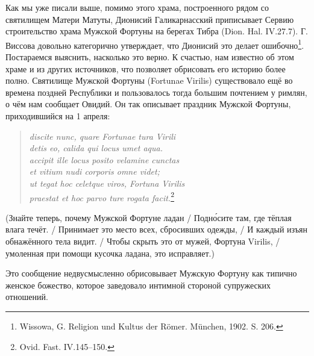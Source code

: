 Как мы уже писали выше, помимо этого храма, построенного рядом со святилищем Матери Матуты, Дионисий Галикарнасский приписывает Сервию строительство храма Мужской Фортуны на берегах Тибра (Dion. Hal. IV.27.7). Г. Виссова довольно категорично утверждает, что Дионисий это делает ошибочно\footnote{Wissowa, G. Religion und Kultus der R\"{o}mer. M\"{u}nchen, 1902. S. 206.}. Постараемся выяснить, насколько это верно. К счастью, нам известно об этом храме и из других источников, что позволяет обрисовать его историю более полно. Святилище Мужской Фортуны (Fortunae Virilis) существовало ещё во времена поздней Республики и пользовалось тогда большим почтением у римлян, о чём нам сообщает Овидий. Он так описывает праздник Мужской Фортуны, приходившийся на 1 апреля:

\begin{verse}
\textit{discite nunc, quare Fortunae tura Virili\\
detis eo, calida qui locus umet aqua.\\
accipit ille locus posito velamine cunctas\\
et vitium nudi corporis omne videt;\\
ut tegat hoc celetque viros, Fortuna Virilis\\
praestat et hoc parvo ture rogata facit.}\footnote{Ovid. Fast. IV.145--150.}
\end{verse}

(Знайте теперь, почему Мужской Фортуне ладан / Подн\'{о}сите там, где тёплая влага течёт. / Принимает это место всех, сбросивших одежды, / И каждый изъян обнажённого тела видит. / Чтобы скрыть это от мужей, Фортуна Virilis, / умоленная при помощи кусочка ладана, это исправляет.)

Это сообщение недвусмысленно обрисовывает Мужскую Фортуну как типично женское божество, которое заведовало интимной стороной супружеских отношений.

